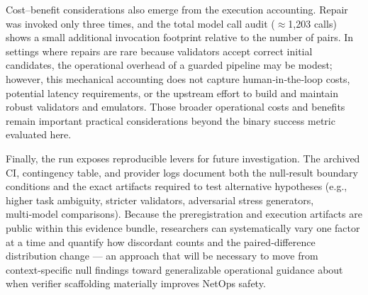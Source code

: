 \documentclass[conference]{IEEEtran}
\begin{document}
Cost--benefit considerations also emerge from the execution accounting. Repair was invoked only three times, and the total model call audit (\ensuremath{\approx}1,203 calls) shows a small additional invocation footprint relative to the number of pairs. In settings where repairs are rare because validators accept correct initial candidates, the operational overhead of a guarded pipeline may be modest; however, this mechanical accounting does not capture human‑in‑the‑loop costs, potential latency requirements, or the upstream effort to build and maintain robust validators and emulators. Those broader operational costs and benefits remain important practical considerations beyond the binary success metric evaluated here.

Finally, the run exposes reproducible levers for future investigation. The archived CI, contingency table, and provider logs document both the null‑result boundary conditions and the exact artifacts required to test alternative hypotheses (e.g., higher task ambiguity, stricter validators, adversarial stress generators, multi‑model comparisons). Because the preregistration and execution artifacts are public within this evidence bundle, researchers can systematically vary one factor at a time and quantify how discordant counts and the paired‑difference distribution change --- an approach that will be necessary to move from context‑specific null findings toward generalizable operational guidance about when verifier scaffolding materially improves NetOps safety.
\end{document}
